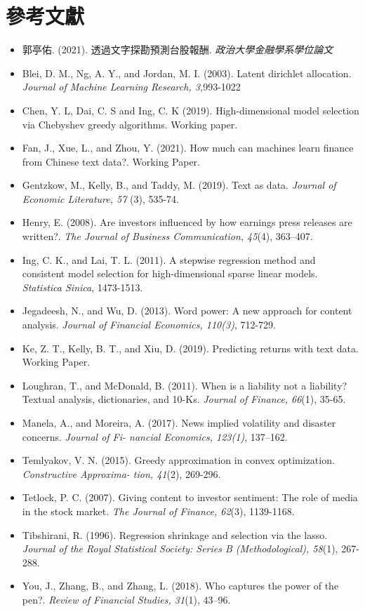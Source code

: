 \chapter{參考文獻}
\begin{itemize}
\item 郭亭佑. (2021). 透過文字探勘預測台股報酬. \textit{政治大學金融學系學位論文}
\item Blei, D. M., Ng, A. Y., and Jordan, M. I. (2003). Latent dirichlet allocation. \textit{Journal of Machine Learning Research, 3,}993-1022
\item Chen, Y. L, Dai, C. S and Ing, C. K (2019). High-dimensional model selection via Chebyshev greedy algorithms. Working paper.
\item Fan, J., Xue, L., and Zhou, Y. (2021). How much can machines learn finance from Chinese text data?. Working Paper.
\item Gentzkow, M., Kelly, B., and Taddy, M. (2019). Text as data. \textit{Journal of Economic Literature, 57 }(3), 535-74.
\item Henry, E. (2008). Are investors influenced by how earnings press releases are written?. \textit{The Journal of Business Communication, 45}(4), 363–407.
\item Ing, C. K., and Lai, T. L. (2011). A stepwise regression method and consistent model selection for high-dimensional sparse linear models. \textit{Statistica Sinica}, 1473-1513.
\item Jegadeesh, N., and Wu, D. (2013). Word power: A new approach for content analysis. \textit{Journal of Financial Economics, 110(3)}, 712-729.
\item Ke, Z. T., Kelly, B. T., and Xiu, D. (2019). Predicting returns with text data. Working Paper.
\item Loughran, T., and McDonald, B. (2011). When is a liability not a liability? Textual analysis,
dictionaries, and 10-Ks. \textit{Journal of Finance, 66}(1), 35-65.
\item Manela, A., and Moreira, A. (2017). News implied volatility and disaster concerns. \textit{Journal of Fi-
nancial Economics, 123(1)}, 137–162.
\item Temlyakov, V. N. (2015). Greedy approximation in convex optimization. \textit{Constructive Approxima- tion, 41}(2), 269-296.
\item Tetlock, P. C. (2007). Giving content to investor sentiment: The role of media in the stock market. \textit{The Journal of Finance, 62}(3), 1139-1168.
\item Tibshirani, R. (1996). Regression shrinkage and selection via the lasso. \textit{Journal of the Royal Statistical Society: Series B (Methodological), 58}(1), 267-288.
\item You, J., Zhang, B., and Zhang, L. (2018). Who captures the power of the pen?. \textit{Review of Financial Studies, 31}(1), 43–96.
\end{itemize}

































